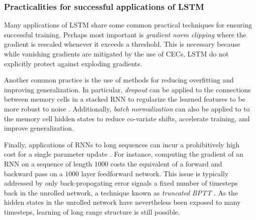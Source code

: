\subsubsection{Practicalities for successful applications of LSTM}

Many applications of LSTM  share some common practical
techniques for ensuring successful training. Perhaps most important is
\emph{gradient norm clipping} \citep{Mikolov2012,Pascanu2012} where the
gradient is rescaled whenever it exceeds a threshold. This is necessary because
while vanishing gradients are mitigated by the use of CECs, LSTM do not
explicitly protect against exploding gradients.

Another common practice is the use of methods for reducing overfitting and
improving generalization. In particular, \emph{dropout}
\citep{srivastava2014dropout} can be applied to the connections between memory
cells in a stacked RNN to regularize the learned features to be more robust to
noise \citep{zaremba2014recurrent}. Additionally, \emph{batch
normalization} \citep{ioffe2015batch} can also be applied to to the memory cell
hidden states to reduce co-variate shifts, accelerate training, and improve
generalization.

Finally, applications of RNNs to long sequences can incur a prohibitively high
cost for a single parameter update \citep{citeulike:13881859}. For instance,
computing the gradient of an RNN on a sequence of length $1000$ costs the
equivalent of a forward and backward pass on a $1000$ layer feedforward
network. This issue is typically addressed by only back-propogating error
signals a fixed number of timesteps back in the unrolled network, a technique
known as \emph{truncated BPTT} \citep{williams1990efficient}. As the hidden
states in the unrolled network have nevertheless been exposed to many timesteps,
learning of long range structure is still possible.
